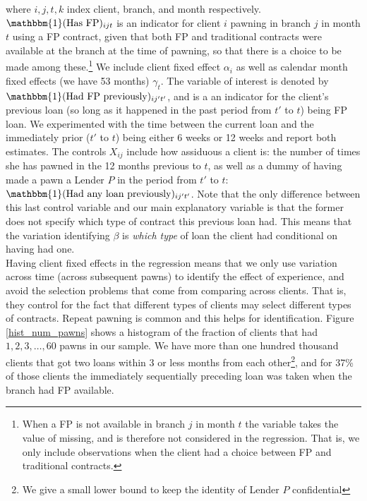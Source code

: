 \documentclass[oneside,11pt]{article}
\begin{document}
\noindent where $i,j,t,k$ index client, branch, and month respectively. $\mathbbm{1}(\text{Has FP})_{ijt}$ is an indicator for client $i$ pawning in branch $j$ in month $t$ using a FP contract, given that both FP and traditional contracts were available at the branch at the time of pawning, so that there is a choice to be made among these.\footnote{When a FP is not available in branch $j$ in month $t$ the variable takes the value of missing, and is therefore not considered in the regression. That is, we only include observations when the client had a choice between FP and traditional contracts.} We include client fixed effect $\alpha_i$ as well as calendar month fixed effects (we have 53 months) $\gamma_t$.  The variable of interest is denoted by $\mathbbm{1}(\text{Had FP previously})_{ij't'}$, and is a an indicator for the client's previous loan (so long as it happened in the past period from $t'$ to $t$) being FP loan. We experimented with the time between the current loan and the immediately prior ($t'$ to $t$) being either 6 weeks or 12 weeks and report both estimates. The controls $X_{ij}$ include how assiduous a client is: the number of times she has pawned in the 12 months previous to $t$, as well as a dummy of having made a pawn a Lender $P$ in the period from $t'$ to $t$:   $\mathbbm{1}(\text{Had any loan previously})_{ij't'}$. Note that the only difference between this last control variable and our main explanatory variable is that the former does not specify which type of contract this previous loan had. This means that the variation identifying $\beta$ is \textit{which type} of loan the client had conditional on having had one.\\

Having client fixed effects in the regression means that we only use variation across time (across subsequent pawns) to identify the effect of experience, and avoid the selection problems that come from comparing across clients. That is, they control for the fact that different types of clients may select different types of contracts. Repeat pawning is common and this helps for identification. Figure \ref{hist_num_pawns} shows a histogram of the fraction of clients that had $1, 2, 3,\ldots, 60$ pawns in our sample. We have more than one hundred thousand clients that got two loans within 3 or less months from each other\footnote{We give a small lower bound to keep the identity of Lender $P$ confidential}, and for 37\% of those clients the immediately sequentially preceding loan was taken when the branch had FP available.\\
\end{document}
